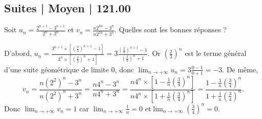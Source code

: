 \subsection{Suites | Moyen | 121.00}



\begin{question}
Soit $\displaystyle u_n=\frac{2^{n+1}-3^{n+1}}{2^n+3^n}$ et $\displaystyle v_n=\frac{n2^{2n}-3^n}{n2^{2n}+3^n}$. Quelles sont les bonnes réponses ?
\begin{answers}  
\end{answers}
\begin{explanations}
D'abord, $\displaystyle u_n=\frac{3^{n+1}\times \left[\left(\frac{2}{3}\right)^{n+1}-1\right]}{3^n\times \left[\left(\frac{2}{3}\right)^{n}+1\right]}=3\frac{\left(\frac{2}{3}\right)^{n+1}-1}{\left(\frac{2}{3}\right)^n+1}$. Or $\displaystyle \left(\frac{2}{3}\right)^n$ est le terme général d'une suite géométrique de limite $0$, donc $\displaystyle \lim _{n\to +\infty}u_n=3\frac{0-1}{0+1}=-3$. De même, 
$$\displaystyle v_n=\frac{n(2^2)^n-3^n}{n(2^2)^n+3^n}=\frac{n4^n-3^n}{n4^n+3^n}=\frac{n4^n\times \left[1-\frac{1}{n}\left(\frac{3}{4}\right)^{n}\right]}{n4^n\times \left[1+\frac{1}{n}\left(\frac{3}{4}\right)^{n}\right]}=\frac{1-\frac{1}{n}\left(\frac{3}{4}\right)^{n}}{1+\frac{1}{n}\left(\frac{3}{4}\right)^{n}}.$$
Donc $\displaystyle \lim _{n\to +\infty}v_n=1$ car $\displaystyle \lim _{n\to +\infty}\frac{1}{n}=0$ et$\displaystyle \lim _{n\to +\infty}\left(\frac{3}{4}\right)^{n}=0$.
\end{explanations}
\end{question}



